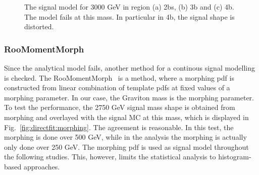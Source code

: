 \begin{figure}[htbp!]
\begin{center}
\caption{The signal model for 3000 GeV in region (a) 2bs, (b) 3b and (c) 4b. The model fails at this mass. In particular in 4b, the signal shape is distorted.}
\label{fig:directfit:signalmodel3k}
\end{center}
\end{figure}

\subsubsection{RooMomentMorph}

Since the analytical model fails, another method for a continous signal modelling is checked. The RooMomentMorph~\cite{roomomentmorph} is a method, where a morphing pdf is constructed from linear combination of template pdfs at fixed values of a morphing parameter. In our case, the Graviton mass is the morphing parameter. To test the performance, the 2750 GeV signal mass shape is obtained from morphing and overlayed with the signal MC at this mass, which is displayed in Fig.~\ref{fig:directfit:morphing}. The agreement is reasonable. In this test, the morphing is done over 500 GeV, while in the analysis the morphing is actually only done over 250 GeV. The morphing pdf is used as signal model throughout  the following studies. This, however, limits the statistical analysis to histogram-based approaches.

